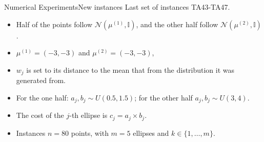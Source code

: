 \documentclass{beamer}
\theoremstyle{definition}
\begin{document}
\begin{frame}{Numerical Experiments}{New instances}
	Last set of instances TA43-TA47.
	\begin{itemize}
		\item Half of the points follow $\mathcal{N}(\mu^{(1)}, \mathbb{I})$, and the other half follow $\mathcal{N}(\mu^{(2)}, \mathbb{I})$.
		\item $\mu^{(1)} = (-3, -3)$ and $\mu^{(2)} = (-3, -3)$,
		\item $w_j$ is set to its distance to the mean that from the distribution it was generated from.
		\item For the one half: $a_j, b_j \sim U(0.5, 1.5)$; for the other half $a_j, b_j \sim U(3, 4)$.
		\item The cost of the $j$-th ellipse is $c_j = a_j \times b_j$.
		\item Instances  $n=80$ points, with $m=5$ ellipses and $k \in \{1,\dots, m\}$.
	\end{itemize}
\end{frame}
\end{document}
